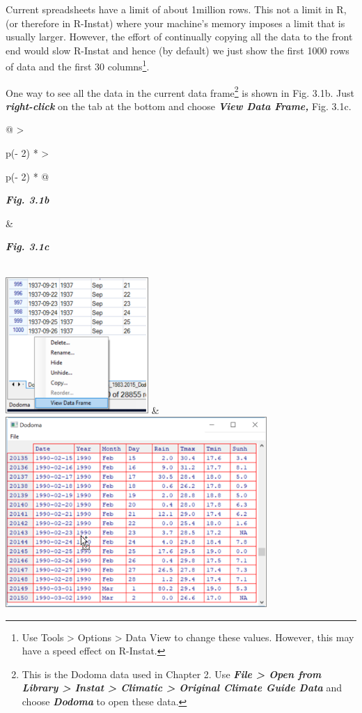 \documentclass[
  letterpaper,
  DIV=11,
  numbers=noendperiod]{scrreprt}
\begin{document}
Current spreadsheets have a limit of about 1million rows. This not a
limit in R, (or therefore in R-Instat) where your machine's memory
imposes a limit that is usually larger. However, the effort of
continually copying all the data to the front end would slow R-Instat
and hence (by default) we just show the first 1000 rows of data and the
first 30 columns\footnote{Use Tools \textgreater{} Options
  \textgreater{} Data View to change these values. However, this may
  have a speed effect on R-Instat.}.

One way to see all the data in the current data frame\footnote{This is
  the Dodoma data used in Chapter 2. Use \textbf{\emph{File
  \textgreater{} Open from Library \textgreater{} Instat \textgreater{}
  Climatic \textgreater{} Original Climate Guide Data}} and choose
  \textbf{\emph{Dodoma}} to open these data.} is shown in Fig. 3.1b.
Just \textbf{\emph{right-click}} on the tab at the bottom and choose
\textbf{\emph{View Data Frame,}} Fig. 3.1c.

\begin{longtable}[]{@{}
  >{\raggedright\arraybackslash}p{(\columnwidth - 2\tabcolsep) * }
  >{\raggedright\arraybackslash}p{(\columnwidth - 2\tabcolsep) * }@{}}
\toprule\noalign{}
\begin{minipage}[b]{\linewidth}\raggedright
\textbf{\emph{Fig. 3.1b}}
\end{minipage} & \begin{minipage}[b]{\linewidth}\raggedright
\textbf{\emph{Fig. 3.1c}}
\end{minipage} \\
\midrule\noalign{}
\endhead
\bottomrule\noalign{}
\endlastfoot
\includegraphics[width=2.13743in,height=2.04389in]{figures/Fig3.1b.png}
&
\includegraphics[width=3.90648in,height=2.84051in]{figures/Fig3.1c.png} \\
\end{longtable}
\end{document}
